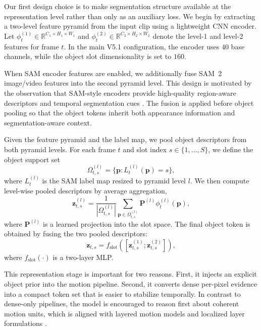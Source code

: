 Our first design choice is to make segmentation structure available at the representation level rather than only as an auxiliary loss. We begin by extracting a two-level feature pyramid from the input clip using a lightweight CNN encoder. Let $\phi_t^{(1)} \in \mathbb{R}^{C_1\times H_1\times W_1}$ and $\phi_t^{(2)} \in \mathbb{R}^{C_2\times H_2\times W_2}$ denote the level-1 and level-2 features for frame $t$. In the main V5.1 configuration, the encoder uses $40$ base channels, while the object slot dimensionality is set to $160$.

When SAM encoder features are enabled, we additionally fuse SAM~2 image/video features into the second pyramid level. This design is motivated by the observation that SAM-style encoders provide high-quality region-aware descriptors and temporal segmentation cues \cite{kirillov2023segment,ravi2024sam2}. The fusion is applied before object pooling so that the object tokens inherit both appearance information and segmentation-aware context.

Given the feature pyramid and the label map, we pool object descriptors from both pyramid levels. For each frame $t$ and slot index $s\in\{1,\dots,S\}$, we define the object support set
\begin{equation}
\Omega_{t,s}^{(l)} = \{\mathbf{p} : L_t^{(l)}(\mathbf{p}) = s\},
\end{equation}
where $L_t^{(l)}$ is the SAM label map resized to pyramid level $l$. We then compute level-wise pooled descriptors by average aggregation,
\begin{equation}
\mathbf{z}_{t,s}^{(l)} = \frac{1}{|\Omega_{t,s}^{(l)}|} \sum_{\mathbf{p} \in \Omega_{t,s}^{(l)}} \mathbf{P}^{(l)}\phi_t^{(l)}(\mathbf{p}),
\end{equation}
where $\mathbf{P}^{(l)}$ is a learned projection into the slot space. The final object token is obtained by fusing the two pooled descriptors:
\begin{equation}
\mathbf{z}_{t,s} = f_{\mathrm{slot}}\left([\mathbf{z}_{t,s}^{(1)} ; \mathbf{z}_{t,s}^{(2)}]\right),
\end{equation}
where $f_{\mathrm{slot}}(\cdot)$ is a two-layer MLP.

This representation stage is important for two reasons. First, it injects an explicit object prior into the motion pipeline. Second, it converts dense per-pixel evidence into a compact token set that is easier to stabilize temporally. In contrast to dense-only pipelines, the model is encouraged to reason first about coherent motion units, which is aligned with layered motion models and localized layer formulations \cite{wang1994representing,sevillalara2016optical}.

